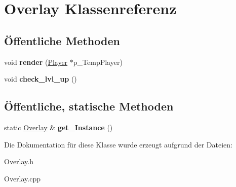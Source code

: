 \hypertarget{class_overlay}{\section{Overlay Klassenreferenz}
\label{class_overlay}
}
\subsection*{Öffentliche Methoden}
\begin{DoxyCompactItemize}
\item 
\hypertarget{class_overlay_ab5e47eefa2743c08bc208131c8b17a45}{void {\bfseries render} (\hyperlink{class_player}{Player} $\ast$p\-\_\-\-Temp\-Player)}\label{class_overlay_ab5e47eefa2743c08bc208131c8b17a45}

\item 
\hypertarget{class_overlay_a6e01bd776bf1daf819ced8e0e45b4478}{void {\bfseries check\-\_\-lvl\-\_\-up} ()}\label{class_overlay_a6e01bd776bf1daf819ced8e0e45b4478}

\end{DoxyCompactItemize}
\subsection*{Öffentliche, statische Methoden}
\begin{DoxyCompactItemize}
\item 
\hypertarget{class_overlay_a6f0ea07b818fdc4ea2b00f1ed8169a6f}{static \hyperlink{class_overlay}{Overlay} \& {\bfseries get\-\_\-\-Instance} ()}\label{class_overlay_a6f0ea07b818fdc4ea2b00f1ed8169a6f}

\end{DoxyCompactItemize}


Die Dokumentation für diese Klasse wurde erzeugt aufgrund der Dateien\-:\begin{DoxyCompactItemize}
\item 
Overlay.\-h\item 
Overlay.\-cpp\end{DoxyCompactItemize}

